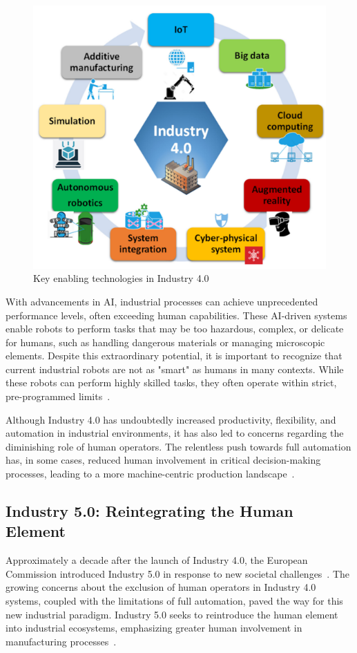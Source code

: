 \begin{figure}[!htbp]
    \centering
    \includegraphics[width=0.6\linewidth]{figs/key-tech-industry-4.png}
    \caption{Key enabling technologies in Industry 4.0~\cite{Ahmed2022}}
    \label{fig:key-tech-industry-4}
\end{figure}

With advancements in \ac{AI}, industrial processes can achieve unprecedented performance levels, often exceeding human capabilities. These \ac{AI}-driven systems enable robots to perform tasks that may be too hazardous, complex, or delicate for humans, such as handling dangerous materials or managing microscopic elements. Despite this extraordinary potential, it is important to recognize that current industrial robots are not as "smart" as humans in many contexts. While these robots can perform highly skilled tasks, they often operate within strict, pre-programmed limits~\cite{Ahmed2022}.

Although Industry 4.0 has undoubtedly increased productivity, flexibility, and automation in industrial environments, it has also led to concerns regarding the diminishing role of human operators. The relentless push towards full automation has, in some cases, reduced human involvement in critical decision-making processes, leading to a more machine-centric production landscape~\cite{GOLOVIANKO2023102}.

\subsection{Industry 5.0: Reintegrating the Human Element}

Approximately a decade after the launch of Industry 4.0, the European Commission introduced Industry 5.0 in response to new societal challenges~\cite{industry5}. The growing concerns about the exclusion of human operators in Industry 4.0 systems, coupled with the limitations of full automation, paved the way for this new industrial paradigm. Industry 5.0 seeks to reintroduce the human element into industrial ecosystems, emphasizing greater human involvement in manufacturing processes~\cite{su11164371}.

